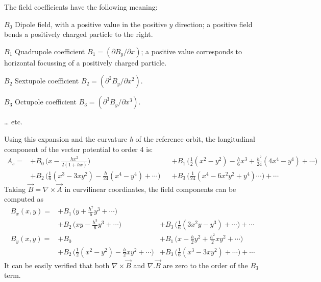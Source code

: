 The field coefficients have the following meaning: 
\begin{madlist}
   \item[$B_0$] 
     Dipole field, with a positive value in the
     positive $y$ direction; a positive field bends a positively
     charged particle to the right.  
   \item[$B_1$] 
     Quadrupole coefficient
     \( B_1 = ( \partial B_y / \partial x ) \);
     a positive value corresponds to horizontal focussing of a
     positively charged particle. 
   \item[$B_2$] 
     Sextupole coefficient
     \( B_2 =  ( \partial^2 B_y / \partial x^2 ) \). 
   \item[$B_3$] 
     Octupole coefficient
     \( B_3 =  ( \partial^3 B_y / \partial x^3 ) \). 
   \item[\ldots] etc.
\end{madlist} 

Using this expansion and the curvature {\it h} of the reference
orbit, the longitudinal component of the vector potential to order 4 is:  
\begin{equation}
\begin{aligned}
A_s =  
&+ B_0\,\Big(x-\frac{hx^2}{2(1+hx)}\Big)&
&+ B_1\,\Big(\frac{1}{2}(x^2-y^2) - \frac{h}{6}x^3 + \frac{h^2}{24}(4x^4-y^4)+\cdots\Big) \\
&+ B_2\,\Big(\frac{1}{6}(x^3-3xy^2) - \frac{h}{24}(x^4-y^4)+\cdots \Big)&
&+ B_3\,\Big(\frac{1}{24}(x^4-6x^2y^2+y^4) \cdots \Big)+\cdots
\end{aligned}
\end{equation}
Taking \(\vec{B} = \nabla \times \vec{A}\) in curvilinear coordinates,
the field components can be computed as  
\begin{equation}
\begin{aligned}
B_x(x,y) = &+ B_1\,\Big(y+\frac{h^2}{6}y^3+\cdots\Big)  &  \\
           &+ B_2\,\Big(xy - \frac{h^3}{6}y^3+\cdots \Big) &+ B_3\,\Big(\frac{1}{6}(3x^2y-y^3)+ \cdots \Big)+\cdots\\
B_y(x,y)=  &+ B_0   &+ B_1\,\Big(x-\frac{h}{2}y^2+\frac{h^2}{2}xy^2+\cdots \Big)\\
           &+ B_2\,\Big(\frac{1}{2}(x^2-y^2)-\frac{h}{2}xy^2+\cdots \Big) &+ B_3\,\Big(\frac{1}{6}(x^3-3xy^2)+ \cdots \Big)+\cdots
\end{aligned}
\end{equation}
It can be easily verified that both \(\nabla \times \vec{B}\)
and \(\nabla . \vec{B}\) are zero to the order of the
\(B_3\) term.  

